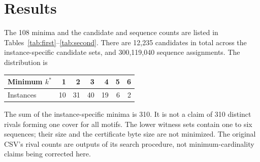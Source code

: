 \documentclass[10pt,a4paper]{article}
\begin{document}
\section{Results}
The 108 minima and the candidate and sequence counts are listed in Tables~\ref{tab:first}--\ref{tab:second}. There are 12,235 candidates in total across the instance-specific candidate sets, and 300,119,040 sequence assignments. The distribution is
\begin{center}
\begin{tabular}{lrrrrrr}\toprule
Minimum $k^*$ &1&2&3&4&5&6\\\midrule
Instances &10&31&40&19&6&2\\\bottomrule
\end{tabular}
\end{center}
The sum of the instance-specific minima is 310. It is not a claim of 310 distinct rivals forming one cover for all motifs. The lower witness sets contain one to six sequences; their size and the certificate byte size are not minimized. The original CSV's rival counts are outputs of its search procedure, not minimum-cardinality claims being corrected here.
\end{document}
